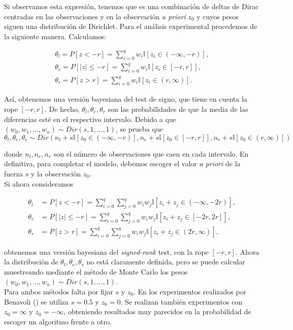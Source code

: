 	Si observamos esta expresión, tenemos que es una 
combinación de deltas de Dirac centradas en las observaciones
y en la observación \textit{a priori} $z_0$ y cuyos pesos
siguen una distribución de Dirichlet. Para el análisis
experimental procedemos de la siguiente manera. Calculamos:

\begin{align*}
	\theta_l = P[ z < -r ] = 
				\sum\limits_{i = 0}^q 
					w_i \mathbb{I}[ z_i \in (-\infty,-r)],\\
	\theta_e = P[ |z| \leq -r ] = 
				\sum\limits_{i = 0}^q 
					w_i \mathbb{I}[ z_i \in [-r,r]], \\
	\theta_r = P[ z > r ] = 
				\sum\limits_{i = 0}^q 
					w_i \mathbb{I}[ z_i \in (r, \infty)].
\end{align*}

	Así, obtenemos una versión bayesiana del test de signo, 
que tiene en cuenta la rope $[-r,r]$. De hecho, $\theta_l,
\theta_e, \theta_r$ son las probabilidades de que la media
de las diferencias esté en el respectivo intervalo. 
Debido a que $(w_0, w_1, \dots, w_n) \sim Dir(s,1, \dots, 
1)$, se prueba que
	\[ 
		\theta_l,\theta_e, \theta_r \sim
		Dir(n_l + s \mathbb{I}[ z_0 \in (-\infty,-r) ],
			n_e + s \mathbb{I}[ z_0 \in [-r,r] ],
			n_r + s \mathbb{I}[ z_0 \in (r, \infty) ])
	\]
	
	donde $n_l, n_e, n_r$ son el número de observaciones 
que caen en cada intervalo. En definitiva, para 
completar el modelo, debemos escoger el valor \textit{a 
priori} de la fuerza $s$ y la observación $z_0$.\\

	Si ahora consideramos
	
\begin{align*}
	\theta_l &= P[ z < -r ] = 
				\sum\limits_{i = 0}^q 
				\sum\limits_{j = 0}^q 
					w_i w_j 
					\mathbb{I}[ z_i + z_j 
								\in (-\infty,-2r)],\\
	\theta_e &= P[ |z| \leq -r ] = 
				\sum\limits_{i = 0}^q 
				\sum\limits_{j = 0}^q 
					w_i w_j 
					\mathbb{I}[ z_i + z_j 
								\in [-2r,2r]], \\
	\theta_r &= P[ z > r ] = 
				\sum\limits_{i = 0}^q 
				\sum\limits_{j = 0}^q 
					w_i w_j 
					\mathbb{I}[ z_i + z_j 
								\in (2r, \infty)],
\end{align*}

	obtenemos una versión bayesiana del \textit{signed-rank}
test, con la rope $[-r,r]$. Ahora la distribución de 
$\theta_l, \theta_e, \theta_r$ no está claramente definida,
pero se puede calcular muestreando mediante el método
de Monte Carlo los pesos $(w_0, w_1, \dots, w_n) \sim 
Dir(s,1, \dots, 1)$.\\
	Para ambos métodos falta por fijar $s$ y $z_0$. 
En los experimentos realizados por Benavoli 
(\cite{BENAVOLI16}) se utiliza $s=0.5$ y $z_0=0$. Se realizan 
también experimentos con $z_0 = \infty$ y $z_0 = -\infty$, 
obteniendo resultados muy parecidos en la probabilidad
de escoger un algoritmo frente a otro.


